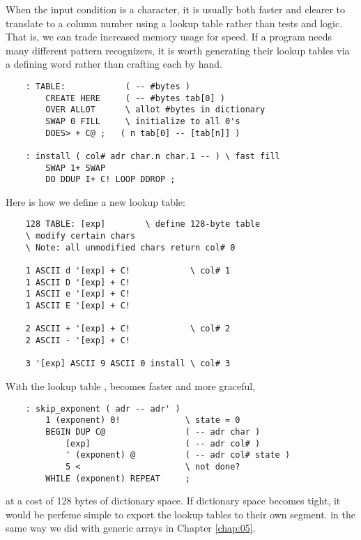 When the input condition is a character, it is usually both faster and clearer to translate to a column number using a lookup table rather than tests and logic. That is, we can trade increased memory usage for speed. If a program needs many different pattern recognizers, it is worth generating their lookup tables via a defining word rather than crafting each by hand.

\begin{lstlisting}
    : TABLE:            ( -- #bytes )
        CREATE HERE     ( -- #bytes tab[0] )
        OVER ALLOT      \ allot #bytes in dictionary
        SWAP 0 FILL     \ initialize to all 0's
        DOES> + C@ ;   ( n tab[0] -- [tab[n]] )

    : install ( col# adr char.n char.1 -- ) \ fast fill
        SWAP 1+ SWAP
        DO DDUP I+ C! LOOP DDROP ;
\end{lstlisting}

Here is how we define a new lookup table:

\begin{lstlisting}
    128 TABLE: [exp]        \ define 128-byte table
    \ modify certain chars
    \ Note: all unmodified chars return col# 0

    1 ASCII d '[exp] + C!            \ col# 1
    1 ASCII D '[exp] + C!
    1 ASCII e '[exp] + C!
    1 ASCII E '[exp] + C!
    
    2 ASCII + '[exp] + C!            \ col# 2
    2 ASCII - '[exp] + C!

    3 '[exp] ASCII 9 ASCII 0 install \ col# 3
\end{lstlisting}

With the lookup table \bc{[exp]},  becomes faster and more graceful,

\begin{lstlisting}
    : skip_exponent ( adr -- adr' )
        1 (exponent) 0!             \ state = 0
        BEGIN DUP C@                ( -- adr char )
            [exp]                   ( -- adr col# )
            ' (exponent) @          ( -- adr col# state )
            5 <                     \ not done?
        WHILE (exponent) REPEAT     ;
\end{lstlisting}

at a cost of 128 bytes of dictionary space. If dictionary space becomes tight, it would be perfeme simple to export the lookup tables to their own segment. in the same way we did with generic arrays in Chapter \ref{chap:05}.

